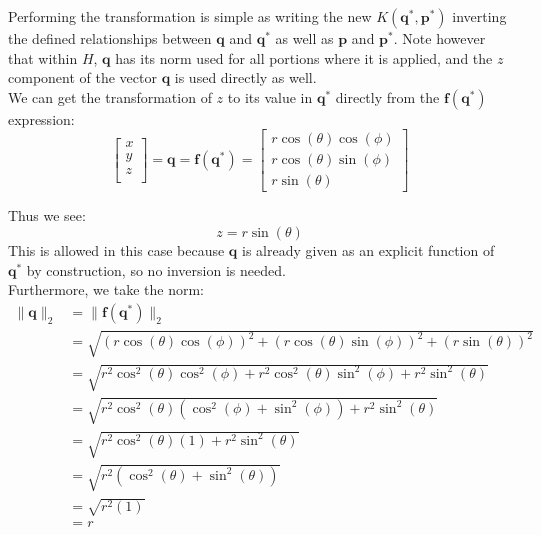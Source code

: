 \documentclass[titlepage]{article}
\begin{document}
Performing the transformation is simple as writing the new $K(\boldsymbol{q}^*,\boldsymbol{p}^*)$ inverting the defined relationships between $\boldsymbol{q}$ and $\boldsymbol{q}^*$ as well as $\boldsymbol{p}$ and $\boldsymbol{p}^*$. Note however that within $H$, $\boldsymbol{q}$ has its norm used for all portions where it is applied, and the $z$ component of the vector $\boldsymbol{q}$ is used directly as well. \\

We can get the transformation of $z$ to its value in $\boldsymbol{q}^*$ directly from the $\boldsymbol{f}(\boldsymbol{q}^*)$ expression:
\begin{equation}
	\begin{bmatrix}
		x \\
		y \\
		z \\
	\end{bmatrix}=
	\boldsymbol{q}=\boldsymbol{f}(\boldsymbol{q}^*)=
	\begin{bmatrix}
		r\cos(\theta)\cos(\phi) \\
		r\cos(\theta)\sin(\phi) \\
		r\sin(\theta)
	\end{bmatrix}
\end{equation}

Thus we see:
\begin{equation}
	z=r\sin(\theta)
\end{equation}
This is allowed in this case because $\boldsymbol{q}$ is already given as an explicit function of $\boldsymbol{q}^*$ by construction, so no inversion is needed. \\

Furthermore, we take the norm:
\begin{equation}
	\begin{split}
		\|\boldsymbol{q}\|_2&=\|\boldsymbol{f}(\boldsymbol{q}^*)\|_2 \\
		&=\sqrt{\left(r\cos(\theta)\cos(\phi)\right)^2+\left(r\cos(\theta)\sin(\phi)\right)^2+\left(r\sin(\theta)\right)^2} \\
		&=\sqrt{r^2\cos^2(\theta)\cos^2(\phi)+r^2\cos^2(\theta)\sin^2(\phi)+r^2\sin^2(\theta)} \\
		&=\sqrt{r^2\cos^2(\theta)\left(\cos^2(\phi)+\sin^2(\phi)\right)+r^2\sin^2(\theta)} \\
		&=\sqrt{r^2\cos^2(\theta)\left(1\right)+r^2\sin^2(\theta)} \\
		&=\sqrt{r^2\left(\cos^2(\theta)+\sin^2(\theta)\right)} \\
		&=\sqrt{r^2\left(1\right)} \\
		&=r
	\end{split}
\end{equation}
\end{document}
